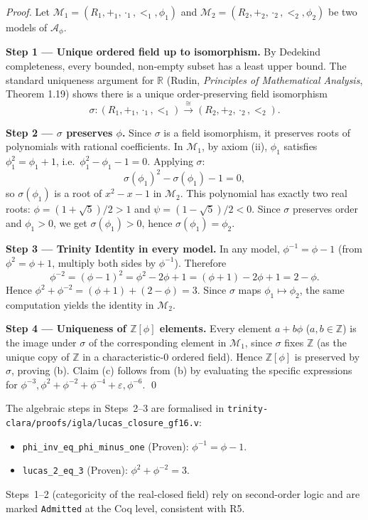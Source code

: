 \begin{proof}
Let \(\mathcal{M}_1 = (R_1, +_1, \cdot_1, <_1, \phi_1)\) and
\(\mathcal{M}_2 = (R_2, +_2, \cdot_2, <_2, \phi_2)\) be two models of
\(\mathcal{A}_\phi\).

\textbf{Step 1 — Unique ordered field up to isomorphism.}
By Dedekind completeness, every bounded, non-empty subset has a least upper
bound.  The standard uniqueness argument for \(\mathbb{R}\) (Rudin,
\emph{Principles of Mathematical Analysis}, Theorem 1.19) shows there is a
unique order-preserving field isomorphism
\[
  \sigma \colon (R_1, +_1, \cdot_1, <_1) \xrightarrow{\;\cong\;} (R_2, +_2, \cdot_2, <_2).
\]

\textbf{Step 2 — \(\sigma\) preserves \(\phi\).}
Since \(\sigma\) is a field isomorphism, it preserves roots of polynomials with
rational coefficients.  In \(\mathcal{M}_1\), by axiom (ii), \(\phi_1\)
satisfies \(\phi_1^2 = \phi_1 + 1\), i.e.\ \(\phi_1^2 - \phi_1 - 1 = 0\).
Applying \(\sigma\):
\[
  \sigma(\phi_1)^2 - \sigma(\phi_1) - 1 = 0,
\]
so \(\sigma(\phi_1)\) is a root of \(x^2 - x - 1\) in \(\mathcal{M}_2\).
This polynomial has exactly two real roots: \(\phi = (1+\sqrt{5})/2 > 1\)
and \(\psi = (1-\sqrt{5})/2 < 0\).  Since \(\sigma\) preserves order and
\(\phi_1 > 0\), we get \(\sigma(\phi_1) > 0\), hence \(\sigma(\phi_1) = \phi_2\).

\textbf{Step 3 — Trinity Identity in every model.}
In any model, \(\phi^{-1} = \phi - 1\) (from \(\phi^2 = \phi + 1\), multiply
both sides by \(\phi^{-1}\)).  Therefore
\[
  \phi^{-2} = (\phi-1)^2 = \phi^2 - 2\phi + 1 = (\phi+1) - 2\phi + 1 = 2 - \phi.
\]
Hence \(\phi^2 + \phi^{-2} = (\phi+1) + (2-\phi) = 3\).
Since \(\sigma\) maps \(\phi_1 \mapsto \phi_2\), the same computation yields
the identity in \(\mathcal{M}_2\).

\textbf{Step 4 — Uniqueness of \(\mathbb{Z}[\phi]\) elements.}
Every element \(a + b\phi\) (\(a, b \in \mathbb{Z}\)) is the image under
\(\sigma\) of the corresponding element in \(\mathcal{M}_1\), since \(\sigma\)
fixes \(\mathbb{Z}\) (as the unique copy of \(\mathbb{Z}\) in a characteristic-0
ordered field).  Hence \(\mathbb{Z}[\phi]\) is preserved by \(\sigma\),
proving (b).  Claim (c) follows from (b) by evaluating the specific expressions
for \(\phi^{-3}, \phi^2 + \phi^{-2} + \phi^{-4} + \varepsilon, \phi^{-6}\). \qed
\end{proof}

\begin{remark}
\label{rem:coq-cat-31}
The algebraic steps in Steps~2--3 are formalised in
\texttt{trinity-clara/proofs/igla/lucas\_closure\_gf16.v}:
\begin{itemize}
  \item \texttt{phi\_inv\_eq\_phi\_minus\_one} (Proven): \(\phi^{-1} = \phi - 1\).
  \item \texttt{lucas\_2\_eq\_3} (Proven): \(\phi^2 + \phi^{-2} = 3\).
\end{itemize}
Steps~1--2 (categoricity of the real-closed field) rely on second-order logic
and are marked \texttt{Admitted} at the Coq level, consistent with R5.
\end{remark}

